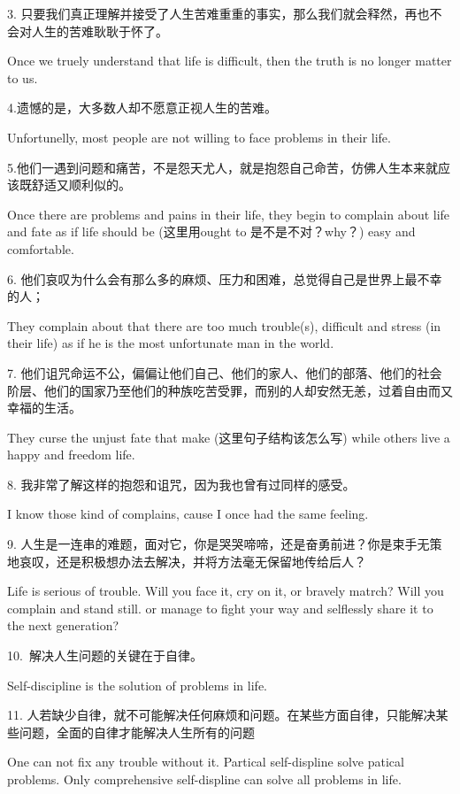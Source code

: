 \documentclass[UTF8]{article}
\begin{document}
3. 只要我们真正理解并接受了人生苦难重重的事实，那么我们就会释然，再也不会对人生的苦难耿耿于怀了。

Once we truely understand that life is difficult, then the truth is no longer matter to us. 


4.遗憾的是，大多数人却不愿意正视人生的苦难。

Unfortunelly, most people are not willing to face problems in their life. 


5.他们一遇到问题和痛苦，不是怨天尤人，就是抱怨自己命苦，仿佛人生本来就应该既舒适又顺利似的。

Once there are problems and pains in their life, they begin to complain about life and fate as if life should be (这里用ought to 是不是不对？why？)  easy and comfortable.  


6. 他们哀叹为什么会有那么多的麻烦、压力和困难，总觉得自己是世界上最不幸的人；

They complain about that there are too much trouble(s), difficult and stress (in their life) as if he is the most unfortunate man in the world. 


7. 他们诅咒命运不公，偏偏让他们自己、他们的家人、他们的部落、他们的社会阶层、他们的国家乃至他们的种族吃苦受罪，而别的人却安然无恙，过着自由而又幸福的生活。

They curse the unjust fate that make (这里句子结构该怎么写) while others live a happy and freedom life. 

8. 我非常了解这样的抱怨和诅咒，因为我也曾有过同样的感受。

I know those kind of complains, cause I once had the same feeling.

9. 人生是一连串的难题，面对它，你是哭哭啼啼，还是奋勇前进？你是束手无策地哀叹，还是积极想办法去解决，并将方法毫无保留地传给后人？

 Life is serious of trouble. Will you face it, cry on it, or bravely matrch? Will you complain and stand still. or manage to fight your way and selflessly share it to the  next generation?


10. 解决人生问题的关键在于自律。

Self-discipline is the solution of problems in life. 


11. 人若缺少自律，就不可能解决任何麻烦和问题。在某些方面自律，只能解决某些问题，全面的自律才能解决人生所有的问题

One can not fix any trouble without it. Partical self-displine solve patical problems. Only comprehensive self-displine can solve all problems in life.
\end{document}
